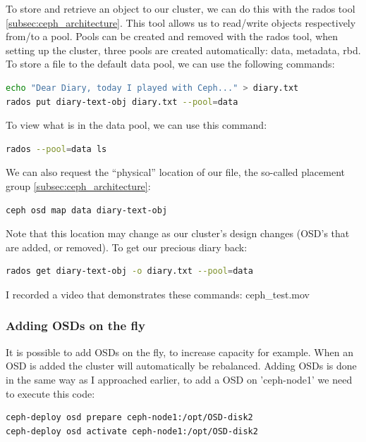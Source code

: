 \documentclass[12pt]{report}
\begin{document}
To store and retrieve an object to our cluster, we can do this with
the rados tool \ref{subsec:ceph_architecture}. This tool allows us to
read/write objects respectively from/to a pool.
Pools can be created and removed with the rados tool, when setting up
the cluster, three pools are created automatically: data, metadata,
rbd.
To store a file to the default data pool, we can use the following
commands:
\begin{lstlisting}[language=bash]
echo "Dear Diary, today I played with Ceph..." > diary.txt
rados put diary-text-obj diary.txt --pool=data
\end{lstlisting}
To view what is in the data pool, we can use this command:
\begin{lstlisting}[language=bash]
rados --pool=data ls
\end{lstlisting}
We can also request the ``physical'' location of our file, the
so-called placement group \ref{subsec:ceph_architecture}:
\begin{lstlisting}[language=bash]
ceph osd map data diary-text-obj
\end{lstlisting}
Note that this location may change as our cluster's design changes
(OSD's that are added, or removed).
To get our precious diary back:
\begin{lstlisting}[language=bash]
rados get diary-text-obj -o diary.txt --pool=data
\end{lstlisting}
I recorded a video that demonstrates these commands: ceph\_test.mov

\subsubsection{Adding OSDs on the fly}
It is possible to add OSDs on the fly, to increase capacity for
example. When an OSD is added the cluster will automatically be
rebalanced.
Adding OSDs is done in the same way as I approached earlier,
to add a OSD on 'ceph-node1' we need to execute this code:
\begin{lstlisting}[language=bash]
ceph-deploy osd prepare ceph-node1:/opt/OSD-disk2
ceph-deploy osd activate ceph-node1:/opt/OSD-disk2
\end{lstlisting}
\end{document}

